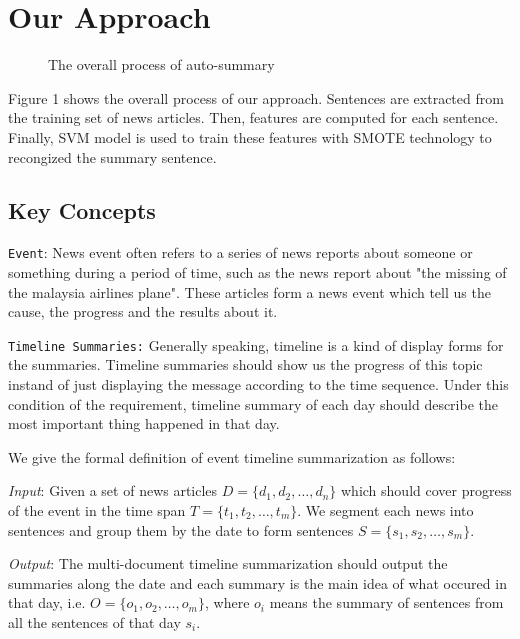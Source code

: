 \documentclass{acm_proc_article-sp}
\begin{document}
%
\section{Our Approach}
%

\begin{figure}\label{process}
\centering
{}
\caption{The overall process of auto-summary}
\end{figure}

Figure 1 shows the overall process of our approach.
Sentences are extracted from the training set of news articles.
Then, features are computed for each sentence. 
Finally, SVM model is used to train these features with SMOTE technology to recongized the summary sentence.


\subsection{Key Concepts}

\texttt{Event}: News event often refers to a series of news reports about someone or something during a period of time, such as the news report about "the missing of the malaysia airlines plane". These articles form a news event which tell us the cause, the progress and the results about it. 

\texttt{Timeline Summaries:} Generally speaking, timeline is a kind of display forms for the summaries. Timeline summaries should show us the progress of this topic instand of just displaying the message according to the time sequence. Under this condition of the requirement, timeline summary of each day should describe the most important thing happened in that day.

We give the formal definition of event timeline summarization as follows:

\textit{Input}: Given a set of news articles $D=\{d_1, d_2, \dots, d_n\}$ which should cover progress of the event in the time span $T=\{t_1, t_2, \dots, t_m\}$. We segment each news into sentences and group them by the date to form sentences $S=\{s_1, s_2, \dots, s_m\}$. 

\textit{Output}: The multi-document timeline summarization should output the summaries along the date and each summary is the main idea of what occured in that day, i.e. $O=\{o_1, o_2, \dots, o_m\}$, where $o_i$ means the summary of sentences from all the sentences of that day $s_i$. 
\end{document}
